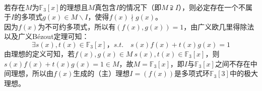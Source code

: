 \begin{solution}\ \\
    若存在$M$为$\mathbb{F}_3[x]$的理想且$M$真包含$I$的情况下（即$M\supsetneqq I$），则必定存在一个不属于$I$的多项式$g(x)\in M\backslash I$，使得$f(x)\nmid g(x)$。\\
    因为$f(x)$为不可约多项式，所以有$(f(x),g(x))=1$，由广义欧几里得除法以及广义Bézout定理可知：
    \begin{equation*}
        \exists s(x),t(x)\in\mathbb{F}_3[x]，s.t.\quad s(x)f(x)+t(x)g(x)=1
    \end{equation*}
    由理想的定义可知，若$f(x),g(x)\in M\ s(x),t(x)\in\mathbb{F}_3[x]$，则$s(x)f(x)+t(x)g(x)=1\in M$，故$M=\mathbb{F}_3[x]$，即$I$与$\mathbb{F}_3[x]$之间不存在中间理想，所以由$f(x)$生成的（主）理想$I=(f(x))$是多项式环$\mathbb{F}_3[3]$中的极大理想。
\end{solution}